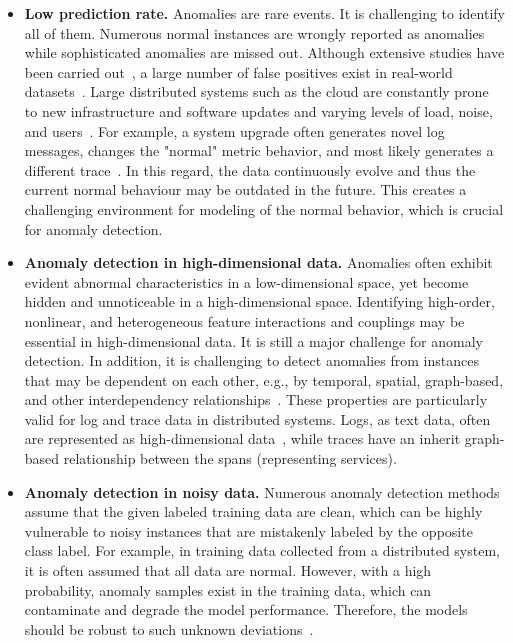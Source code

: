 \begin{itemize}
    \item \textbf{Low prediction rate.} Anomalies are rare events. It is challenging to identify all of them. Numerous normal instances are wrongly reported as anomalies while sophisticated anomalies are missed out. Although extensive studies have been carried out~\cite{liu2008isolation,breunig2000lof}, a large number of false positives exist in real-world datasets~\cite{du2017deeplog,campos2016evaluation,ruff-etal-2019-self,ruff2019deep}. Large distributed systems such as the cloud are constantly prone to new infrastructure and software updates and varying levels of load, noise, and users~\cite{zhang2015rapid}. For example, a system upgrade often generates novel log messages, changes the "normal" metric behavior, and most likely generates a different trace~\cite{zhang2019robust,nedelkoski2020selftracing}. In this regard, the data continuously evolve and thus the current normal behaviour may be outdated in the future. This creates a challenging environment for modeling of the normal behavior, which is crucial for anomaly detection.
    \item \textbf{Anomaly detection in high-dimensional data.} Anomalies often exhibit evident abnormal characteristics in a low-dimensional space, yet become hidden and unnoticeable in a high-dimensional space. Identifying high-order, nonlinear, and heterogeneous feature interactions and couplings may be essential in high-dimensional data. It is still a major challenge for anomaly detection. In addition, it is challenging to detect anomalies from instances that may be dependent on each other, e.g., by temporal, spatial, graph-based, and other interdependency relationships~\cite{pang2020deep}. These properties are particularly valid for log and trace data in distributed systems. Logs, as text data, often are represented as high-dimensional data~\cite{mikolov2013distributed}, while traces have an inherit graph-based relationship between the spans (representing services). 
    \item \textbf{Anomaly detection in noisy data.} Numerous anomaly detection methods assume that the given labeled training data are clean, which can be highly vulnerable to noisy instances that are mistakenly labeled by the opposite class label. For example, in training data collected from a distributed system, it is often assumed that all data are normal. However, with a high probability, anomaly samples exist in the training data, which can contaminate and degrade the model performance. Therefore, the models should be robust to such unknown deviations~\cite{du2019robust}.

\end{itemize}
